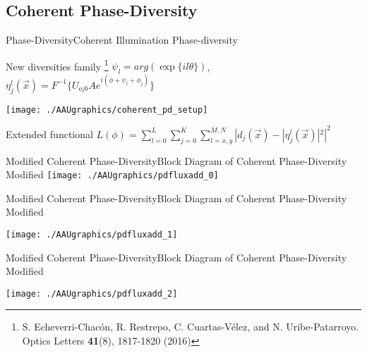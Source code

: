 \documentclass[10pt]{beamer}
\begin{document}

\subsection{Coherent Phase-Diversity}
\begin{frame}{Phase-Diversity}{Coherent Illumination Phase-diversity}

\begin{block}{New diversities family \footnote[6]{S. Echeverri-Chacón, R. Restrepo, C. Cuartas-Vélez, and N. Uribe-Patarroyo. Optics Letters \textbf{41}(8), 1817-1820 (2016)}}
$\psi_l = arg(\exp \{il\theta\})$,\\
$\eta_j^l(\vec{x}) = F^{-1}\{U_{ojb} A e^{i(\phi + \psi_l + \phi_j)}\}$
\end{block}

\pause
\vspace*{-15pt}
\hspace*{15pt}

\texttt{[image: ./AAUgraphics/coherent\_pd\_setup]}
\pause
\begin{block}{Extended functional}
$L(\phi) = \sum\limits_{l=0}^{L} \sum\limits_{j=0}^{K} \sum\limits_{l=x,y}^{M,N} |d_j(\vec{x}) - |\eta_j^l(\vec{x})|^2|^2$
\end{block}
\end{frame}


\begin{frame}{Modified Coherent Phase-Diversity}{Block Diagram of Coherent Phase-Diversity Modified}
\hspace*{40pt}
\texttt{[image: ./AAUgraphics/pdfluxadd\_0]}
\end{frame}

\begin{frame}{Modified Coherent Phase-Diversity}{Block Diagram of Coherent Phase-Diversity Modified}
\addtocounter{framenumber}{-1}
\hspace*{40pt}
\texttt{[image: ./AAUgraphics/pdfluxadd\_1]}
\end{frame}

\begin{frame}{Modified Coherent Phase-Diversity}{Block Diagram of Coherent Phase-Diversity Modified}
\addtocounter{framenumber}{-1}
\hspace*{40pt}
\texttt{[image: ./AAUgraphics/pdfluxadd\_2]}
\end{frame}
\end{document}
